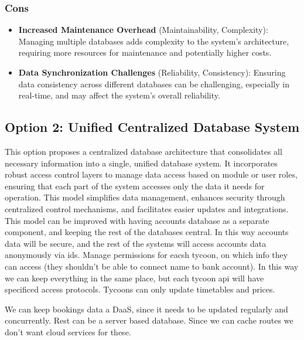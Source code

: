 \subsubsection*{Cons}
\begin{itemize}[noitemsep]
    \item \textbf{Increased Maintenance Overhead} (Maintainability, Complexity): Managing multiple databases adds complexity to the system's architecture, requiring more resources for maintenance and potentially higher costs.
    \item \textbf{Data Synchronization Challenges} (Reliability, Consistency): Ensuring data consistency across different databases can be challenging, especially in real-time, and may affect the system's overall reliability.
\end{itemize}

\subsection*{Option 2: Unified Centralized Database System}

This option proposes a centralized database architecture that consolidates all necessary information into a single, unified database system. It incorporates robust access control layers to manage data access based on module or user roles, ensuring that each part of the system accesses only the data it needs for operation. This model simplifies data management, enhances security through centralized control mechanisms, and facilitates easier updates and integrations. This model can be improved with having accounts database as a separate component, and keeping the rest of the databases central. In this way accounts data will be secure, and the rest of the systems will access accounts data anonymously via ids. Manage permissions for eacsh tycoon, on which info they can access (they shouldn't be able to connect name to bank account). In this way we can keep everything in the same place, but each tycoon api will have specificed access protocols. Tycoons can only update timetables and prices.

We can keep bookings data a DaaS, since it needs to be updated regularly and concurrently. Rest can be a server based database. Since we can cache routes we don't want cloud services for these. 

